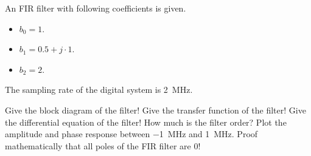 \begin{question}[subtitle={FIR Filter}]
	An FIR filter with following coefficients is given.
	\begin{itemize}
		\item $b_0 = 1$.
		\item $b_1 = 0.5 + j \cdot 1$.
		\item $b_2 = 2$.
	\end{itemize}

	The sampling rate of the digital system is \SI{2}{MHz}.
	
	\begin{tasks}
		\task
		Give the block diagram of the filter!
		\task
		Give the transfer function of the filter!
		\task
		Give the differential equation of the filter!
		\task
		How much is the filter order?
		\task
		Plot the amplitude and phase response between \SI{-1}{MHz} and \SI{1}{MHz}.
		\task
		Proof mathematically that all poles of the FIR filter are $0$!
	\end{tasks}
\end{question}

